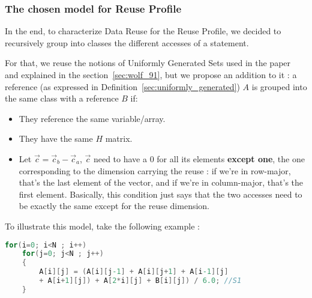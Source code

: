 \documentclass[paper=a4, fontsize=11.5pt]{scrartcl}
\numberwithin{equation}{section}        %
\numberwithin{figure}{section}          %
\numberwithin{table}{section}               %
\begin{document}

        \subsubsection{The chosen model for Reuse Profile}
            In the end, to characterize Data Reuse for the Reuse Profile, we decided to
            recursively group into classes the different accesses of a statement.

            For that, we reuse the notions of Uniformly Generated Sets used in the paper~\cite{Wolf'91}
            and explained in the section~\ref{sec:wolf_91}, but we propose an addition to it :
            a reference (as expressed in Definition~\ref{sec:uniformly_generated}) $A$ is 
            grouped into the same class with a reference $B$ if:
            \begin{itemize}
                \item They reference the same variable/array.
                \item They have the same $H$ matrix.
                \item Let $\vec{c}=\vec{c}_b - \vec{c}_a$, $\vec{c}$ need to have a $0$
                    for all its elements \textbf{except one}, the one corresponding
                    to the dimension carrying the reuse : if we're in row-major, that's the
                    last element of the vector, and if we're in column-major, that's the first
                    element. Basically, this condition just says that the two accesses need
                    to be exactly the same except for the reuse dimension.
            \end{itemize}

            \bigskip

            To illustrate this model, take the following example :

\begin{lstlisting}[frame=single, language=C, caption=Reuse Profiling example, label={lst:rp_example_0}]
for(i=0; i<N ; i++)
    for(j=0; j<N ; j++)
    {
        A[i][j] = (A[i][j-1] + A[i][j+1] + A[i-1][j]
        + A[i+1][j]) + A[2*i][j] + B[i][j]) / 6.0; //S1
    }
\end{lstlisting}
\end{document}
